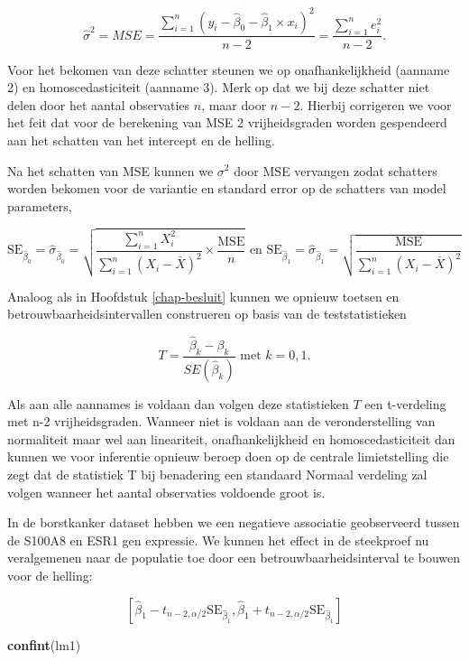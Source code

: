 \documentclass[
  12pt,dutch]{book}
\newenvironment{Shaded}{\begin{snugshade}}{\end{snugshade}}
\newcommand{\FunctionTok}[1]{\textcolor[rgb]{0.13,0.29,0.53}{\textbf{#1}}}
\newcommand{\NormalTok}[1]{#1}
\theoremstyle{definition}
\theoremstyle{definition}
\theoremstyle{definition}
\theoremstyle{definition}
\theoremstyle{remark}
\begin{document}
\[\hat\sigma^2=MSE=\frac{\sum\limits_{i=1}^n \left(y_i-\hat\beta_0-\hat\beta_1\times x_i\right)^2}{n-2}=\frac{\sum\limits_{i=1}^n e^2_i}{n-2}.\]

Voor het bekomen van deze schatter steunen we op onafhankelijkheid (aanname 2) en homoscedasticiteit (aanname 3). Merk op dat we bij deze schatter niet delen door het aantal observaties \(n\), maar door \(n-2\). Hierbij corrigeren we voor het feit dat voor de berekening van MSE 2 vrijheidsgraden worden gespendeerd aan het schatten van het intercept en de helling.

Na het schatten van MSE kunnen we \(\sigma^2\) door MSE vervangen zodat schatters worden bekomen voor de variantie en standard error op de schatters van model parameters,

\[\text{SE}_{\hat{\beta}_0}=\hat\sigma_{\hat{\beta}_0}=\sqrt{\frac{\sum\limits_{i=1}^n X^2_i}{\sum\limits_{i=1}^n (X_i-\bar X)^2} \times\frac{\text{MSE}}{n}} \text{ en } \text{SE}_{\hat{\beta}_1}=\hat\sigma_{\hat{\beta}_1}=\sqrt{\frac{\text{MSE}}{\sum\limits_{i=1}^n (X_i-\bar X)^2}}\]

Analoog als in Hoofdstuk \ref{chap-besluit} kunnen we opnieuw toetsen en betrouwbaarheidsintervallen construeren op basis van de teststatistieken

\[T=\frac{\hat{\beta}_k-\beta_k}{SE(\hat{\beta}_k)} \text{ met } k=0,1.\]

Als aan alle aannames is voldaan dan volgen deze statistieken \(T\) een t-verdeling met n-2 vrijheidsgraden.
Wanneer niet is voldaan aan de veronderstelling van normaliteit maar wel aan lineariteit, onafhankelijkheid en homoscedasticiteit dan kunnen we voor inferentie opnieuw beroep doen op de centrale limietstelling die zegt dat de statistiek T bij benadering een standaard Normaal verdeling zal volgen wanneer het aantal observaties voldoende groot is.

In de borstkanker dataset hebben we een negatieve associatie geobserveerd tussen de S100A8 en ESR1 gen expressie.
We kunnen het effect in de steekproef nu veralgemenen naar de populatie toe door een betrouwbaarheidsinterval te bouwen voor de helling:

\[[\hat\beta_1 - t_{n-2,\alpha/2} \text{SE}_{\hat\beta_1},\hat\beta_1 + t_{n-2,\alpha/2} \text{SE}_{\hat\beta_1}]\]

\begin{Shaded}
\begin{Highlighting}[]
\FunctionTok{confint}\NormalTok{(lm1)}
\end{Highlighting}
\end{Shaded}
\end{document}
